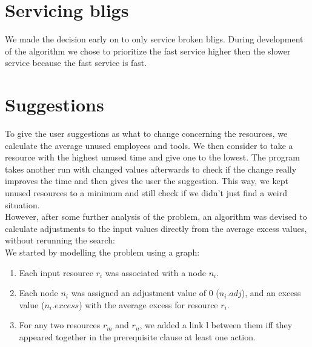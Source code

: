 \documentclass{article}
\begin{document}
\section*{Servicing bligs}
We made the decision early on to only service broken bligs. During development of the algorithm we chose to prioritize the fast service higher then the slower service because the fast service is fast.

\section*{Suggestions}
To give the user suggestions as what to change concerning the resources, we calculate the average unused employees and tools. We then consider to take a resource with the highest unused time and give one to the lowest. The program takes another run with changed values afterwards to check if the change really improves the time and then gives the user the suggestion.
This way, we kept unused resources to a minimum and still check if we didn't just find a weird situation.
\\[2ex]
However, after some further analysis of the problem, an algorithm was devised to calculate adjustments to the input values directly from the average excess values, without rerunning the search:
\\[2ex]
We started by modelling the problem using a graph:
\begin{enumerate}
	\item Each input resource $r_i$ was associated with a node $n_i$.
	\item Each node $n_i$ was assigned an adjustment value of 0 ($n_{i}.adj$), and an excess value ($n_{i}.excess$) with the average excess for resource $r_i$.
	\item For any two resources $r_m$ and $r_n$, we added a link l between them iff they appeared together in the prerequisite clause at least one action.
\end{enumerate}
\end{document}

